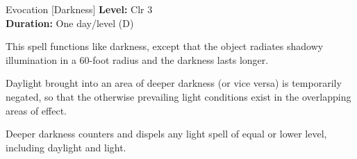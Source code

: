 {Evocation [Darkness]}
{
	\textbf{Level:}
	Clr 3\\
	\textbf{Duration:}
	One day/level (D)\\
}
{
	This spell functions like darkness, except that the object radiates shadowy illumination in a 60-foot radius and the darkness lasts longer.

Daylight brought into an area of deeper darkness (or vice versa) is temporarily negated, so that the otherwise prevailing light conditions exist in the overlapping areas of effect.

	Deeper darkness counters and dispels any light spell of equal or lower level, including daylight and light.

}
